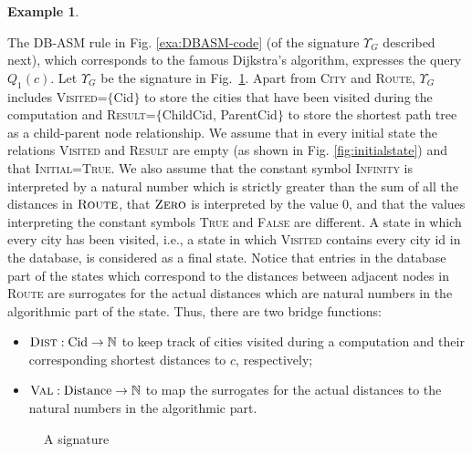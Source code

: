 \documentclass[preprint,11pt]{elsarticle}
\theoremstyle{definition}
\newtheorem{example}{Example}[section]
\theoremstyle{remark}
\begin{document}
\begin{example}
\begin{figure}[!htbp]
\end{figure}


The DB-ASM rule in Fig. \ref{exa:DBASM-code} (of the signature $\Upsilon_G$ described next), which corresponds to the famous Dijkstra's algorithm, expresses the query $Q_1(c)$. Let $\Upsilon_G$ be the signature in Fig.~\ref{exa:DBASM-signature}.
Apart from \textsc{City} and \textsc{Route}, $\Upsilon_G$ includes \textsc{Visited}=$\{$Cid$\}$ to store the cities that have been visited during the computation and \textsc{Result}=$\{$ChildCid, ParentCid$\}$ to store the shortest path tree as a child-parent node relationship. We assume that in every initial state the relations \textsc{Visited} and \textsc{Result} are empty (as shown in Fig. \ref{fig:initialstate}) and that \textsc{Initial}=\textsc{True}. We also assume that the constant symbol \textsc{Infinity} is interpreted by a natural number which is strictly greater than the sum of all the distances in $\textsc{Route}$, that $\textsc{Zero}$ is interpreted by the value $0$,
and that the values interpreting the constant symbols
\textsc{True} and \textsc{False} are
different. A state in which every city has been visited, i.e., a state in which \textsc{Visited} contains every city id in the database, is considered as a final state. Notice that entries in the database part of the states which correspond to the distances between adjacent nodes in \textsc{Route} are surrogates for the actual distances which are natural numbers in the algorithmic part of the state. Thus, there are two bridge functions:
 \begin{itemize}
 \item $\textsc{Dist}:\mathrm{Cid} \rightarrow \mathbb{N}$ to keep track of cities visited during a computation and their corresponding shortest distances to $c$, respectively;
 \item $\textsc{Val}:\mathrm{Distance} \rightarrow \mathbb{N}$ to map the surrogates for the actual distances to the natural numbers in the algorithmic part.
 \end{itemize}


\begin{figure}[!ht]
\hspace*{1cm}\begin{minipage}{6cm}
{\centering{} \caption{A signature } \label{exa:DBASM-signature}}
\end{minipage}
\end{figure}











\end{example}
\end{document}
